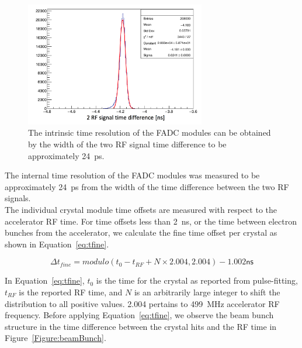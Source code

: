 \begin{figure}[H]
  \centering
      \includegraphics[width=0.7\textwidth]{pics/performance/rfRes.png}
  \caption[FADC intrinsic time resolution]{The intrinsic time resolution of the FADC modules can be obtained by the width of the two RF signal time difference to be approximately 24~ps.}
  \label{Figure:intrTres}
\end{figure}

The internal time resolution of the FADC modules was measured to be approximately 24~ps from the width of the time difference between the two RF signals. \\
\indent The individual crystal module time offsets are measured with respect to the accelerator RF time. For time offsets less than 2~ns, or the time between electron bunches from the accelerator, we calculate the fine time offset per crystal as shown in Equation~\eqref{eq:tfine}.

\begin{equation}
	\label{eq:tfine}
	\Delta t_{fine} = modulo(t_0 - t_{RF} + N\times 2.004, 2.004) - 1.002 \textsf{ns}
\end{equation}

In Equation~\eqref{eq:tfine}, $t_0$ is the time for the crystal as reported from pulse-fitting, $t_{RF}$ is the reported RF time, and $N$ is an arbitrarily large integer to shift the distribution to all positive values. 2.004 pertains to 499~MHz accelerator RF frequency. Before applying Equation~\eqref{eq:tfine}, we observe the beam bunch structure in the time difference between the crystal hits and the RF time in Figure~\ref{Figure:beamBunch}. 

